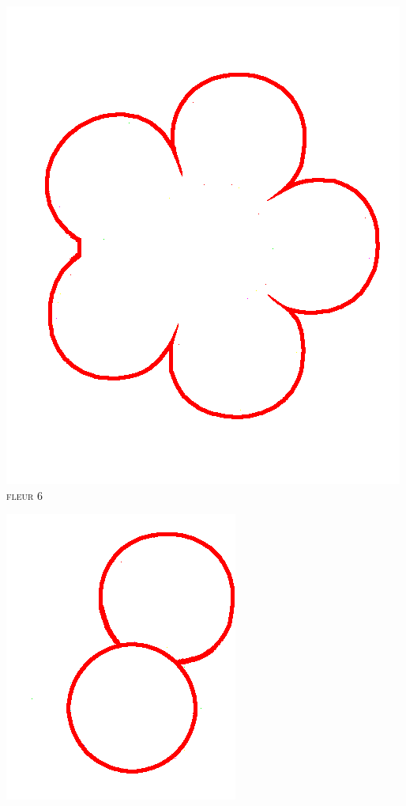 \documentclass[french]{article}
\begin{document}
  \begin{center}
    \begin{minipage}{.3\textwidth}
      \begin{center}
	\includegraphics[scale=0.19]{./pictures/flower7.png}\\
	\textsc{fleur 6}
      \end{center}
    \end{minipage}
    \begin{minipage}{.3\textwidth}
      \begin{center}
	\includegraphics[scale=0.19]{./pictures/flower8.png}\\

\end{center}
\end{minipage}
\end{center}
\end{document}
